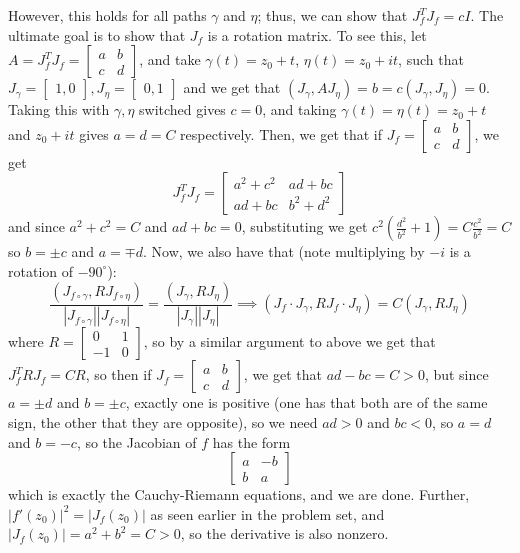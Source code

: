 \documentclass[12pt,letterpaper]{article}
\theoremstyle{definition}
\begin{document}
However, this holds for all paths $\gamma$ and $\eta$; thus, we can show that $J^{T}_{f}J_{f} = cI$. The ultimate goal is to show that $J_{f}$ is a rotation matrix. To see this, let $A = J^{T}_{f}J_{f} = \begin{bmatrix} a & b \\ c & d \end{bmatrix}$, and take $\gamma(t) = z_{0} + t$, $\eta(t) = z_{0} + it$, such that $J_{\gamma} = \begin{bmatrix} 1, 0 \end{bmatrix}, J_{\eta} = \begin{bmatrix} 0, 1 \end{bmatrix}$ and we get that $(J_{\gamma}, AJ_{\eta}) = b = c(J_{\gamma}, J_{\eta}) = 0$. Taking this with $\gamma, \eta$ switched gives $c = 0$, and taking $\gamma(t) = \eta(t) = z_{0} + t$ and $z_{0} + it$ gives $a = d = C$ respectively. Then, we get that if $J_{f} = \begin{bmatrix} a & b \\ c & d \end{bmatrix}$, we get
\[
  J_{f}^{T}J_{f} = \begin{bmatrix}
    a^{2} + c^{2} & ad + bc \\
    ad + bc & b^{2} + d^{2}
  \end{bmatrix}
\]
and since $a^{2} + c^{2} = C$ and $ad + bc = 0$, substituting we get $c^{2}(\frac{d^{2}}{b^{2}} + 1) = C\frac{c^{2}}{b^{2}} = C$ so $b = \pm c$ and $a = \mp d$. Now, we also have that (note multiplying by $-i$ is a rotation of $-90^{\circ}$):
\[
  \frac{(J_{f \circ \gamma}, RJ_{f \circ \eta})}{|J_{f \circ \gamma}||J_{f \circ \eta}|} = \frac{(J_{\gamma}, RJ_{\eta})}{|J_{\gamma}||J_{\eta}|} \implies (J_{f} \cdot J_{\gamma}, RJ_{f} \cdot J_{\eta}) = C(J_{\gamma}, RJ_{\eta})
\]
where $R = \begin{bmatrix} 0 & 1 \\ -1 & 0 \end{bmatrix}$, so by a similar argument to above we get that $J^{T}_{f}RJ_{f} = CR$, so then if $J_{f} = \begin{bmatrix} a & b \\ c & d \end{bmatrix}$, we get that $ad - bc = C > 0$, but since $a = \pm d$ and $b = \pm c$, exactly one is positive (one has that both are of the same sign, the other that they are opposite), so we need $ad > 0$ and $bc < 0$, so $a = d$ and $b = -c$, so the Jacobian of $f$ has the form
\[
  \begin{bmatrix}
    a & -b \\
    b & a
  \end{bmatrix}
\]
which is exactly the Cauchy-Riemann equations, and we are done. Further, $|f'(z_{0})|^{2} = |J_{f}(z_{0})|$ as seen earlier in the problem set, and $|J_{f}(z_{0})| = a^{2} + b^{2} = C > 0$, so the derivative is also nonzero.
\end{document}
